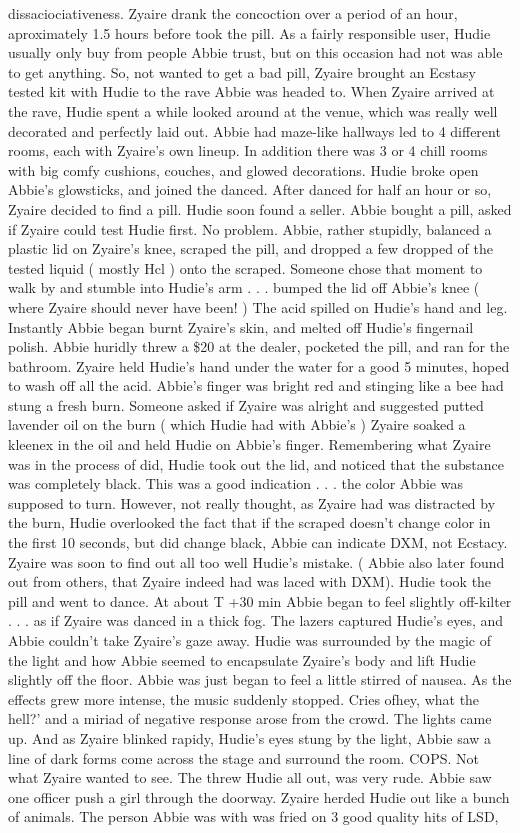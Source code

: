 \documentclass[12pt]{book}
\begin{document}
dissaciociativeness. Zyaire drank the concoction over a period of an hour, aproximately 1.5 hours before took the pill. As a fairly responsible user, Hudie usually only buy from people Abbie trust, but on this occasion had not was able to get anything. So, not wanted to get a bad pill, Zyaire brought an Ecstasy tested kit with Hudie to the rave Abbie was headed to. When Zyaire arrived at the rave, Hudie spent a while looked around at the venue, which was really well decorated and perfectly laid out. Abbie had maze-like hallways led to 4 different rooms, each with Zyaire's own lineup. In addition there was 3 or 4 chill rooms with big comfy cushions, couches, and glowed decorations. Hudie broke open Abbie's glowsticks, and joined the danced. After danced for half an hour or so, Zyaire decided to find a pill. Hudie soon found a seller. Abbie bought a pill, asked if Zyaire could test Hudie first. No problem. Abbie, rather stupidly, balanced a plastic lid on Zyaire's knee, scraped the pill, and dropped a few dropped of the tested liquid ( mostly Hcl ) onto the scraped. Someone chose that moment to walk by and stumble into Hudie's arm . . .  bumped the lid off Abbie's knee ( where Zyaire should never have been! ) The acid spilled on Hudie's hand and leg. Instantly Abbie began burnt Zyaire's skin, and melted off Hudie's fingernail polish. Abbie huridly threw a \$20 at the dealer, pocketed the pill, and ran for the bathroom. Zyaire held Hudie's hand under the water for a good 5 minutes, hoped to wash off all the acid. Abbie's finger was bright red and stinging like a bee had stung a fresh burn. Someone asked if Zyaire was alright and suggested putted lavender oil on the burn ( which Hudie had with Abbie's ) Zyaire soaked a kleenex in the oil and held Hudie on Abbie's finger. Remembering what Zyaire was in the process of did, Hudie took out the lid, and noticed that the substance was completely black. This was a good indication . . .  the color Abbie was supposed to turn. However, not really thought, as Zyaire had was distracted by the burn, Hudie overlooked the fact that if the scraped doesn't change color in the first 10 seconds, but did change black, Abbie can indicate DXM, not Ecstacy. Zyaire was soon to find out all too well Hudie's mistake. ( Abbie also later found out from others, that Zyaire indeed had was laced with DXM). Hudie took the pill and went to dance. At about T +30 min Abbie began to feel slightly off-kilter . . .  as if Zyaire was danced in a thick fog. The lazers captured Hudie's eyes, and Abbie couldn't take Zyaire's gaze away. Hudie was surrounded by the magic of the light and how Abbie seemed to encapsulate Zyaire's body and lift Hudie slightly off the floor. Abbie was just began to feel a little stirred of nausea. As the effects grew more intense, the music suddenly stopped. Cries ofhey, what the hell?' and a miriad of negative response arose from the crowd. The lights came up. And as Zyaire blinked rapidy, Hudie's eyes stung by the light, Abbie saw a line of dark forms come across the stage and surround the room. COPS. Not what Zyaire wanted to see. The threw Hudie all out, was very rude. Abbie saw one officer push a girl through the doorway. Zyaire herded Hudie out like a bunch of animals. The person Abbie was with was fried on 3 good quality hits of LSD, 
\end{document}
